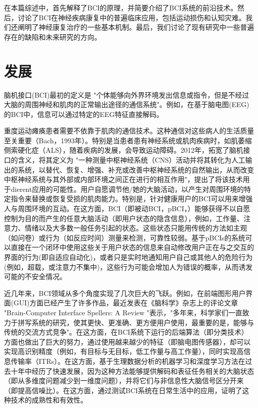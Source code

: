 \documentclass[UTF8,a4paper]{ctexart}
\begin{document}
\par
在本篇综述中，首先解释了BCI的原理，并简要介绍了BCI系统的前沿技术。然后，讨论了BCI在神经疾病康复中的普遍临床应用，包括运动损伤和认知灾难。我们还阐明了神经康复治疗的一些基本机制。最后，我们讨论了现有研究中一些普遍存在的缺陷和未来研究的方向。

\section{发展}
脑机接口(BCI)最初的定义是 "个体能够向外界环境发出信息或指令，但是不经过大脑的周围神经和肌肉的正常输出途径的通信系统"。例如，在基于脑电图(EEG)的BCI中，信息可以通过特定的EEG特征直接解码。
\par
重度运动瘫痪患者需要不依靠于肌肉的通信技术。这种通信对这些病人的生活质量至关重要（Bach，1993年）。特别是当患者患有神经系统或肌肉疾病时，如肌萎缩侧索硬化症（ALS），随着疾病的发展，会导致运动障碍。2012年，\cite{wolpaw2002brain}拓宽了脑机接口的含义，将其定义为 "一种测量中枢神经系统（CNS）活动并将其转化为人工输出的系统，以替代、恢复、增强、补充或改善中枢神经系统的自然输出，从而改变中枢神经系统与其外部或内部环境之间正在进行的相互作用"，提出了将该技术用于dierent应用的可能性。用户自愿调节他/她的大脑活动，以产生对周围环境的特定指令来替换或恢复受损的肌肉能力\cite{abiri2019comprehensive,aloise2013asynchronous,pichiorri2015brain}。特别是，针对健康用户的BCI可以用来增强人与周围环境的互动。在这方面，BCI（即被动BCI，pBCI，\cite{di2018eeg,blankertz2016berlin,cartocci2015mental,zander2011towards,valeriani2019brain,vecchiato2016investigation,astolfi2012cortical,sciaraffa2017brain}）能够获得不以自愿控制为目的而产生的任意大脑活动（即用户状态的隐含信息），例如，工作量、注意力、情绪以及大多数一般任务引起的状态。这些状态只能用传统的方法如主观（如问卷）或行为（如反应时间）测量来检测，可靠性较弱\cite{zander2011context}。基于pBCIs的系统可以直接在一个闭环中使用这些关于用户状态的信息来自动修改用户正在与之交互的界面的行为(即自适应自动化)，或者只是实时地通知用户自己或其他人的危险行为(例如，超载\cite{borghini2017new}，或注意力不集中\cite{di2019brain,sebastiani2020neurophysiological})，这些行为可能会增加人为错误的概率，从而诱发可能的不安全情况。
\par
近几年来，BCI领域从多个角度实现了几次巨大的飞跃。例如，在前端图形用户界面(GUI)方面已经产生了许多作品，最近发表在《脑科学》杂志上的评论文章 "Brain-Computer Interface Spellers: A Review "表示，"多年来，科学家们一直致力于拼写系统的研究，使其更快、更准确、更方便用户使用，最重要的是，能够与传统的交流方式竞争"\cite{rezeika2018brain}。在这方面，在BCI系统下运行的后端算法（即分类技术）方面也做出了巨大的努力\cite{schettini2014self}，通过使用越来越少的特征（即脑电图传感器），却可以实现高识别精度（例如，有目标与无目标，低工作量与高工作量），同时实现高信息传输率（ITRs）。在这方面，基于生理数据分析的机器学习和深度学习方法在过去十年中经历了快速发展，因为这种方法能够提供解码和表征任务相关的大脑状态（即从多维度问题减少到一维度问题），并将它们与非信息性大脑信号区分开来（即提高信噪比）。在这方面，\cite{arico2017passive,arico2018passive}通过测试BCI系统在日常生活中的应用，证明了这种技术的成熟性和有效性。
\end{document}
